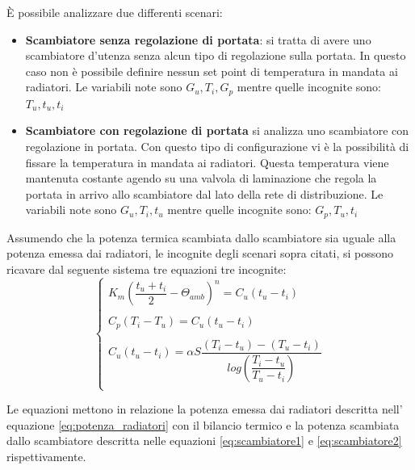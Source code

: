 \documentclass[laurea,oneside,11pt]{USiena_tesiLM}
\begin{document}
\`E possibile analizzare due differenti scenari:
\begin{itemize}
\item \textbf{Scambiatore senza regolazione di portata}: si tratta di avere uno scambiatore d'utenza senza alcun tipo di regolazione sulla portata. In questo caso non è possibile definire nessun set point di temperatura in mandata ai radiatori. Le variabili note sono $G_u, T_i, G_p$ mentre quelle incognite sono: $T_u, t_u, t_i$

\item \textbf{Scambiatore con regolazione di portata} si analizza uno scambiatore con regolazione in portata. Con questo tipo di configurazione vi è la possibilità di fissare la temperatura in mandata ai radiatori. Questa temperatura viene mantenuta costante agendo su una valvola di laminazione che regola la portata in arrivo allo scambiatore dal lato della rete di distribuzione.   Le  variabili note sono $G_u, T_i, t_u$ mentre quelle incognite sono: $G_p, T_u, t_i$
\end{itemize}
Assumendo che la potenza termica scambiata dallo scambiatore sia uguale alla potenza emessa dai radiatori, le incognite degli scenari sopra citati, si possono ricavare dal seguente sistema tre equazioni tre incognite: 
\begin{equation}
\left \{
\begin{array}{rl}
K_m(\dfrac{t_u + t_i}{2} - \Theta_{amb})^n = C_u(t_u - t_i)\\
\\
C_p(T_i - T_u) = C_u(t_u - t_i)\\
\\
C_u(t_u - t_i) = \alpha S \dfrac{(T_i - t_u)-(T_u - t_i )}{log\left( \dfrac{T_i - t_u}{T_u - t_i } \right)}\\
\end{array}
\right.
\end{equation}

Le equazioni mettono in relazione la potenza emessa dai radiatori descritta nell' equazione \ref{eq:potenza_radiatori} con il bilancio termico e la potenza scambiata dallo scambiatore descritta nelle equazioni \ref{eq:scambiatore1} e \ref{eq:scambiatore2} rispettivamente.
\end{document}
